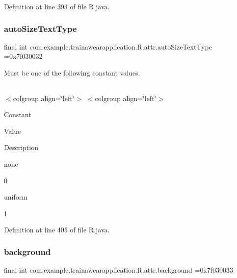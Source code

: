Definition at line 393 of file R.\+java.

\mbox{\label{classcom_1_1example_1_1trainawearapplication_1_1_r_1_1attr_aee41c5e05b311b60f98178fbaf08b826}} 
\subsubsection{\texorpdfstring{autoSizeTextType}{autoSizeTextType}}
{\footnotesize\ttfamily final int com.\+example.\+trainawearapplication.\+R.\+attr.\+auto\+Size\+Text\+Type =0x7f030032\hspace{0.3cm}{\ttfamily [static]}}

Must be one of the following constant values.

\tabulinesep=1mm
\begin{longtabu}spread 0pt [c]{*{0}{|X[-1]}|}
\hline
\end{longtabu}
$<$colgroup align=\char`\"{}left\char`\"{}$>$ $<$colgroup align=\char`\"{}left\char`\"{}$>$ 

Constant

Value

Description 

none

0

uniform

1

Definition at line 405 of file R.\+java.

\mbox{\label{classcom_1_1example_1_1trainawearapplication_1_1_r_1_1attr_a49d074bb5ec9d806bb7a8bcacaab7814}} 
\subsubsection{\texorpdfstring{background}{background}}
{\footnotesize\ttfamily final int com.\+example.\+trainawearapplication.\+R.\+attr.\+background =0x7f030033\hspace{0.3cm}{\ttfamily [static]}}

